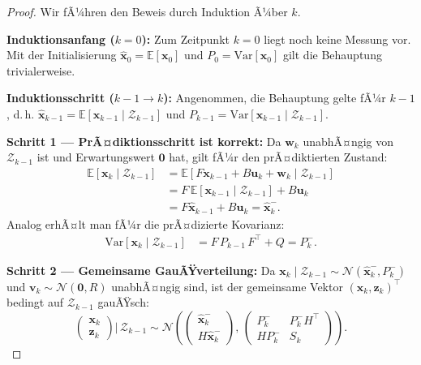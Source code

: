 ﻿\documentclass[a4paper,12pt]{article}
\theoremstyle{definition}
\begin{document}
\begin{proof}
Wir fÃ¼hren den Beweis durch Induktion Ã¼ber $k$.

\textbf{Induktionsanfang ($k=0$):}
Zum Zeitpunkt $k=0$ liegt noch keine Messung vor. Mit der Initialisierung
$\hat{\mathbf{x}}_0 = \mathbb{E}[\mathbf{x}_0]$ und
$P_0 = \mathrm{Var}[\mathbf{x}_0]$ gilt die Behauptung trivialerweise.

\textbf{Induktionsschritt ($k-1 \to k$):}
Angenommen, die Behauptung gelte fÃ¼r $k-1$, d.\,h.
$\hat{\mathbf{x}}_{k-1} = \mathbb{E}[\mathbf{x}_{k-1} \mid \mathcal{Z}_{k-1}]$
und $P_{k-1} = \mathrm{Var}[\mathbf{x}_{k-1} \mid \mathcal{Z}_{k-1}]$.

\textbf{Schritt 1 --- PrÃ¤diktionsschritt ist korrekt:}
Da $\mathbf{w}_k$ unabhÃ¤ngig von $\mathcal{Z}_{k-1}$ ist und Erwartungswert $\mathbf{0}$ hat,
gilt fÃ¼r den prÃ¤diktierten Zustand:
\begin{align*}
    \mathbb{E}[\mathbf{x}_k \mid \mathcal{Z}_{k-1}]
    &= \mathbb{E}[F\mathbf{x}_{k-1} + B\mathbf{u}_k + \mathbf{w}_k \mid \mathcal{Z}_{k-1}] \\
    &= F\,\mathbb{E}[\mathbf{x}_{k-1} \mid \mathcal{Z}_{k-1}] + B\mathbf{u}_k \\
    &= F\hat{\mathbf{x}}_{k-1} + B\mathbf{u}_k
    = \hat{\mathbf{x}}_k^-.
\end{align*}
Analog erhÃ¤lt man fÃ¼r die prÃ¤dizierte Kovarianz:
\begin{align*}
    \mathrm{Var}[\mathbf{x}_k \mid \mathcal{Z}_{k-1}]
    &= F\,P_{k-1}\,F^\top + Q = P_k^-.
\end{align*}

\textbf{Schritt 2 --- Gemeinsame GauÃŸverteilung:}
Da $\mathbf{x}_k \mid \mathcal{Z}_{k-1} \sim \mathcal{N}(\hat{\mathbf{x}}_k^-, P_k^-)$ und
$\mathbf{v}_k \sim \mathcal{N}(\mathbf{0}, R)$ unabhÃ¤ngig sind, ist der gemeinsame Vektor
$(\mathbf{x}_k, \mathbf{z}_k)^\top$ bedingt auf $\mathcal{Z}_{k-1}$ gauÃŸsch:
\[
    \begin{pmatrix}\mathbf{x}_k \\ \mathbf{z}_k \end{pmatrix}
    \Bigg|\, \mathcal{Z}_{k-1}
    \sim \mathcal{N}\!\left(
        \begin{pmatrix}\hat{\mathbf{x}}_k^- \\ H\hat{\mathbf{x}}_k^-\end{pmatrix},\,
        \begin{pmatrix}P_k^- & P_k^- H^\top \\ H P_k^- & S_k \end{pmatrix}
    \right).
\]


\end{proof}
\end{document}

